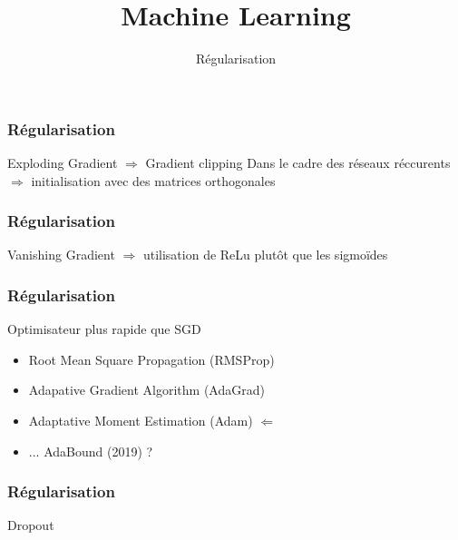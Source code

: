\documentclass{formation}
\title{Machine Learning}
\subtitle{Régularisation}
\begin{document}
\maketitle

\begin{frame}
  \frametitle{Régularisation}
  Exploding Gradient $\Rightarrow$ Gradient clipping
  Dans le cadre des réseaux réccurents $\Rightarrow$ initialisation avec des matrices orthogonales
\end{frame}

\begin{frame}
  \frametitle{Régularisation}
  Vanishing Gradient $\Rightarrow$ utilisation de ReLu plutôt que les sigmoïdes
\end{frame}

\begin{frame}
  \frametitle{Régularisation}
  Optimisateur plus rapide que SGD
  \begin{itemize}
  \item Root Mean Square Propagation (RMSProp)
  \item Adapative Gradient Algorithm (AdaGrad)
  \item Adaptative Moment Estimation (Adam)    $\Leftarrow$
  \item ... AdaBound (2019) ?
 \end{itemize}
\end{frame}

\begin{frame}
  \frametitle{Régularisation}
  Dropout
\end{frame}
\end{document}
